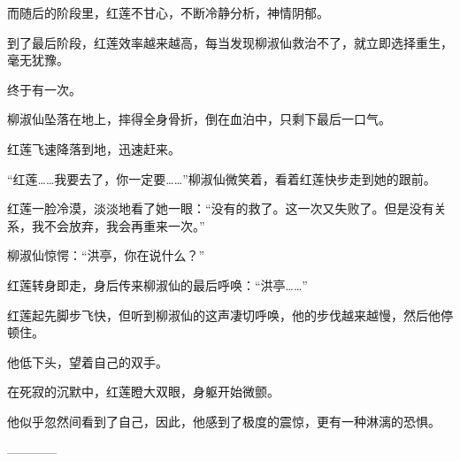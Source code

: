 \begin{this_body}
而随后的阶段里，红莲不甘心，不断冷静分析，神情阴郁。

到了最后阶段，红莲效率越来越高，每当发现柳淑仙救治不了，就立即选择重生，毫无犹豫。

终于有一次。

柳淑仙坠落在地上，摔得全身骨折，倒在血泊中，只剩下最后一口气。

红莲飞速降落到地，迅速赶来。

“红莲……我要去了，你一定要……”柳淑仙微笑着，看着红莲快步走到她的跟前。

红莲一脸冷漠，淡淡地看了她一眼：“没有的救了。这一次又失败了。但是没有关系，我不会放弃，我会再重来一次。”

柳淑仙惊愕：“洪亭，你在说什么？”

红莲转身即走，身后传来柳淑仙的最后呼唤：“洪亭……”

红莲起先脚步飞快，但听到柳淑仙的这声凄切呼唤，他的步伐越来越慢，然后他停顿住。

他低下头，望着自己的双手。

在死寂的沉默中，红莲瞪大双眼，身躯开始微颤。

他似乎忽然间看到了自己，因此，他感到了极度的震惊，更有一种淋漓的恐惧。

------------

\end{this_body}

